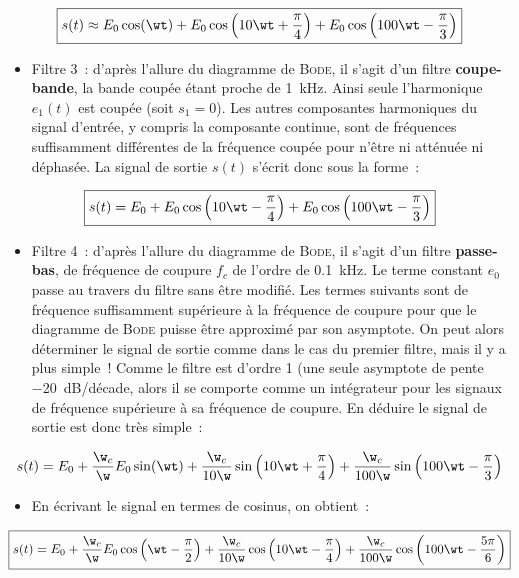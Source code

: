 \documentclass[a4paper, 12pt, final, garamond]{book}
\begin{document}
\[\boxed{
    s(t) \approx
    E_0 \cos (\wt) + E_0 \cos \left(10\wt + \frac{\pi}{4}\right) +
    E_0 \cos \left(100\wt - \frac{\pi}{3}\right)
}\]
\begin{itemize}
    \item Filtre 3~: d'après l'allure du diagramme de \textsc{Bode}, il s'agit d'un
        filtre \textbf{coupe-bande}, la bande coupée étant proche de
        \SI{1}{kHz}. Ainsi seule l'harmonique $e_1(t)$ est coupée (soit $s_1 =
        0$). Les autres composantes harmoniques du signal d'entrée, y compris la
        composante continue, sont de fréquences suffisamment différentes de la
        fréquence coupée pour n'être ni atténuée ni déphasée. La signal de
        sortie $s(t)$ s'écrit donc sous la forme~:
\end{itemize}

\[\boxed{
    s(t) =
    E_0 +
    E_0 \cos \left(10\wt - \frac{\pi}{4}\right) +
    E_0 \cos \left(100\wt - \frac{\pi}{3}\right)
}\]
\begin{itemize}
    \item Filtre 4~: d'après l'allure du diagramme de \textsc{Bode}, il s'agit
        d'un filtre \textbf{passe-bas}, de fréquence de coupure $f_c$ de l'ordre
        de \SI{0.1}{kHz}. Le terme constant $e_0$ passe au travers du filtre
        sans être modifié. Les termes suivants sont de fréquence suffisamment
        supérieure à la fréquence de coupure pour que le diagramme de
        \textsc{Bode} puisse être approximé par son asymptote. On peut alors
        déterminer le signal de sortie comme dans le cas du premier filtre, mais
        il y a plus simple~! Comme le filtre est d'ordre 1 (une seule asymptote
        de pente \SI{-20}{dB/décade}, alors il se comporte comme un intégrateur
        pour les signaux de fréquence supérieure à sa fréquence de coupure. En
        déduire le signal de sortie est donc très simple~:
\end{itemize}

\[s(t) =
    E_0 +
    \frac{\w_c}{\w}E_0\sin(\wt) +
    \frac{\w_c}{10\w}\sin \left( 10\wt + \frac{\pi}{4} \right) +
    \frac{\w_c}{100\w} \sin \left( 100\wt - \frac{\pi}{3} \right)
\]
\begin{itemize}
    \item{}
    En écrivant le signal en termes de cosinus, on obtient~:
\end{itemize}
\[\boxed{
    s(t) = 
    E_0 +
    \frac{\w_c}{\w}E_0\cos\left(\wt - \frac{\pi}{2}\right) +
    \frac{\w_c}{10\w}\cos \left( 10\wt - \frac{\pi}{4} \right) +
    \frac{\w_c}{100\w} \cos \left( 100\wt - \frac{5\pi}{6} \right)
}\]
\end{document}
